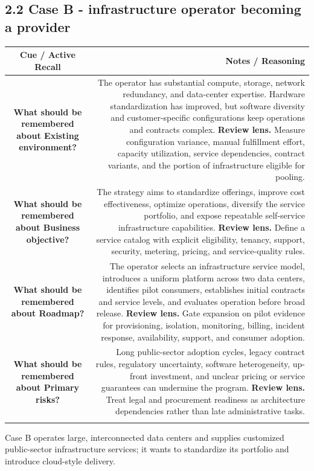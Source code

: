 \documentclass[11pt]{article}
\newcommand{\CornellHeader}{\rowcolor{Navy}\color{white}\bfseries Cue / Active Recall & \color{white}\bfseries Notes / Reasoning \\\endhead}
\newcommand{\CornellRow}[2]{\cellcolor{CueGray}\textbf{#1} & #2 \\\addlinespace[3pt]}
\begin{document}
\subsection{2.2 Case B - infrastructure operator becoming a provider}
\begin{longtable}{@{}C N@{}}
\CornellHeader
\CornellRow{What should be remembered about Existing environment?}{The operator has substantial compute, storage, network redundancy, and data-center expertise. Hardware standardization has improved, but software diversity and customer-specific configurations keep operations and contracts complex. \textbf{Review lens.} Measure configuration variance, manual fulfillment effort, capacity utilization, service dependencies, contract variants, and the portion of infrastructure eligible for pooling.}
\CornellRow{What should be remembered about Business objective?}{The strategy aims to standardize offerings, improve cost effectiveness, optimize operations, diversify the service portfolio, and expose repeatable self-service infrastructure capabilities. \textbf{Review lens.} Define a service catalog with explicit eligibility, tenancy, support, security, metering, pricing, and service-quality rules.}
\CornellRow{What should be remembered about Roadmap?}{The operator selects an infrastructure service model, introduces a uniform platform across two data centers, identifies pilot consumers, establishes initial contracts and service levels, and evaluates operation before broad release. \textbf{Review lens.} Gate expansion on pilot evidence for provisioning, isolation, monitoring, billing, incident response, availability, support, and consumer adoption.}
\CornellRow{What should be remembered about Primary risks?}{Long public-sector adoption cycles, legacy contract rules, regulatory uncertainty, software heterogeneity, up-front investment, and unclear pricing or service guarantees can undermine the program. \textbf{Review lens.} Treat legal and procurement readiness as architecture dependencies rather than late administrative tasks.}
\end{longtable}
\begin{sectionsummarybox}
Case B operates large, interconnected data centers and supplies customized public-sector infrastructure services; it wants to standardize its portfolio and introduce cloud-style delivery.
\end{sectionsummarybox}
\end{document}
